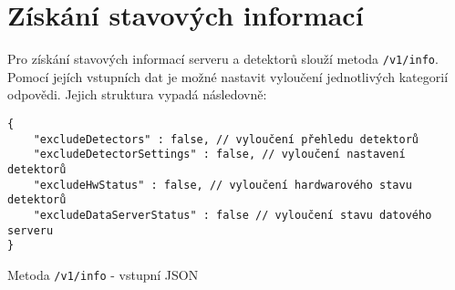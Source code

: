 \section{Získání stavových informací}
Pro získání stavových informací serveru a detektorů slouží metoda \texttt{/v1/info}. Pomocí jejích vstupních dat je možné nastavit vyloučení jednotlivých kategorií odpovědi. Jejich struktura vypadá následovně:

\begin{verbatim}
{
    "excludeDetectors" : false, // vyloučení přehledu detektorů
    "excludeDetectorSettings" : false, // vyloučení nastavení detektorů
    "excludeHwStatus" : false, // vyloučení hardwarového stavu detektorů
    "excludeDataServerStatus" : false // vyloučení stavu datového serveru
}
\end{verbatim}
\sloppy
\begin{code}[h!]
	\caption{Metoda \texttt{/v1/info} - vstupní JSON}
	\label{app:api:info-in}
\end{code}









